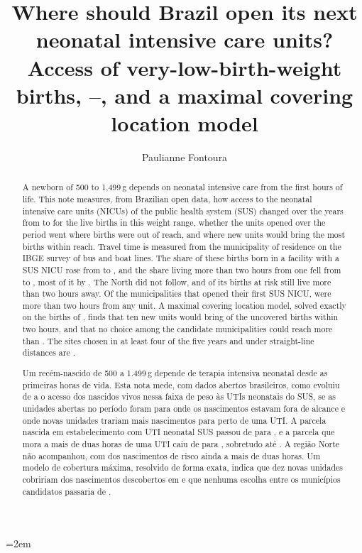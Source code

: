 \documentclass[11pt,a4paper]{article}
\title{Where should Brazil open its next neonatal intensive care units?\\[0.3em]
\large Access of very-low-birth-weight births, \firstYear--\lastYear, and a
maximal covering location model}
\author{Paulianne Fontoura}
\date{}
\begin{document}
\maketitle

\begin{abstract}
\noindent
A newborn of 500 to 1,499\,g depends on neonatal intensive care from the first
hours of life. This note measures, from Brazilian open data, how access to the
neonatal intensive care units (NICUs) of the public health system (SUS) changed
over the \nYears{} years from \firstYear{} to \lastYear{} for the \riskTotal{}
live births in this weight range, whether the units opened over the period went
where births were out of reach, and where new units would bring the most births
within reach. Travel time is measured from the municipality of residence on the
IBGE survey of bus and boat lines. The share of these births born in a facility
with a SUS NICU rose from \bornFirst{} to \bornLast, and the share living more
than two hours from one fell from \overFirst{} to \overLast, most of it by
\midYear. The North did not follow, and \norteOverLast{} of its births at risk
still live more than two hours away. Of the \munOpened{} municipalities that
opened their first SUS NICU, \munOpenedBeyond{} were more than two hours from any
unit. A maximal covering location model, solved exactly on the births of
\pooledYears, finds that ten new units would bring \shareTen{} of the uncovered
births within two hours, and that no choice among the \candidates{} candidate
municipalities could reach more than \ceilingShare. The sites chosen in at least
four of the five years and under straight-line distances are \solidSites.
\end{abstract}

\begingroup
\renewcommand{\abstractname}{Resumo}
\emergencystretch=2em
\begin{abstract}
\noindent
Um recém-nascido de 500 a 1.499\,g depende de terapia intensiva neonatal desde as
primeiras horas de vida. Esta nota mede, com dados abertos brasileiros, como
evoluiu de \firstYear{} a \lastYear{} o acesso dos \ptRiskTotal{} nascidos vivos
nessa faixa de peso às UTIs neonatais do SUS, se as unidades abertas no período
foram para onde os nascimentos estavam fora de alcance e onde novas unidades
trariam mais nascimentos para perto de uma UTI. A parcela nascida em
estabelecimento com UTI neonatal SUS passou de \ptBornFirst{} para \ptBornLast,
e a parcela que mora a mais de duas horas de uma UTI caiu de \ptOverFirst{} para
\ptOverLast, sobretudo até \midYear. A região Norte não acompanhou, com
\ptNorteOverLast{} dos nascimentos de risco ainda a mais de duas horas. Um modelo
de cobertura máxima, resolvido de forma exata, indica que dez novas unidades
cobririam \ptShareTen{} dos nascimentos descobertos em \pooledYears{} e que
nenhuma escolha entre os municípios candidatos passaria de \ptCeilingShare.
\end{abstract}
\endgroup
\end{document}
